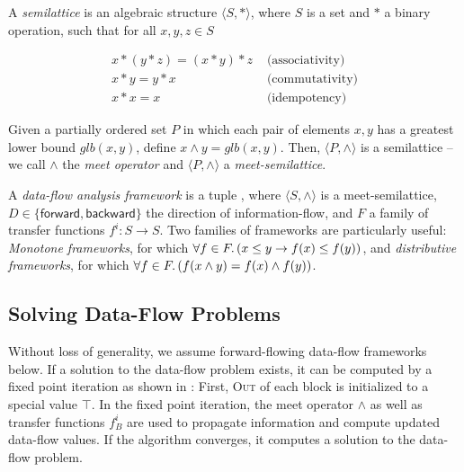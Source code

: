 \begin{definition}
    A \emph{semilattice} is an algebraic structure $\langle S, * \rangle$, where $S$ is a set and $*$ a binary operation, such that for all $x,y,z \in S$
    
    \begin{align}
        x * (y * z) = (x * y) * z &\text{ (associativity)}\\
        x * y = y * x &\text{ (commutativity)}\\
        x * x = x &\text{ (idempotency)}
    \end{align}
    
    Given a partially ordered set $P$ in which each pair of elements $x, y$ has a greatest lower bound $glb(x, y)$, define $x \wedge y = glb(x, y)$. Then, $\langle P, \wedge \rangle$ is a semilattice -- we call $\wedge$ the \emph{meet operator} and $\langle P, \wedge \rangle$ a \emph{meet-semilattice}.
\end{definition}

\begin{definition}
A \emph{data-flow analysis framework} is a tuple , where $\langle S, \wedge \rangle$ is a meet-semilattice, $D \in \{ \textsf{forward}, \textsf{backward} \}$ the direction of in\-for\-ma\-tion-flow, and $F$ a family of transfer functions $f^i: S \rightarrow S$. Two families of frameworks are particularly useful: \emph{Monotone frameworks}, for which $\forall f \in F \ldotp \left(x \le y \rightarrow f(x) \le f(y)\right)$, and \emph{distributive frameworks}, for which $\forall f \in F \ldotp \left(f(x \wedge y) = f(x) \wedge f(y)\right)$.
\end{definition}

\subsection{Solving Data-Flow Problems}

Without loss of generality, we assume forward-flowing data-flow frameworks below. If a solution to the data-flow problem exists, it can be computed by a fixed point iteration as shown in : First, \textsc{Out} of each block is initialized to a special value $\top$. In the fixed point iteration, the meet operator $\wedge$ as well as transfer functions $f^i_B$ are used to propagate information and compute updated data-flow values. If the algorithm converges, it computes a solution to the data-flow problem.

